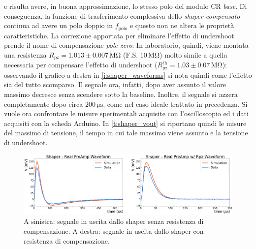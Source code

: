 \documentclass[a4paper,11pt]{article} %
\begin{document}
e risulta avere, in buona approssimazione, lo stesso polo del modulo CR \textit{base}. Di conseguenza, la funzione di
trasferimento complessiva dello \textit{shaper compensato} continua ad avere un polo doppio in $f_{\text{polo}}$ e
questo non ne altera le proprietà caratteristiche. La correzione apportata per eliminare l'effetto di undershoot prende
il nome di compensazione \textit{pole zero}. In laboratorio, quindi, viene montata una resistenza $R_{\text{pz}} = 1.013
\pm 0.007 \, \si{\mega\ohm}$ ($\text{F.S.}\,\, 10 \,\si{\mega\ohm}$) molto simile a quella necessaria per compensare
l'effetto di undershoot ($R_{\text{pz}}^{\text{th}} = 1.03 \pm 0.07 \, \si{\mega\ohm}$): osservando il grafico a destra
in \autoref{i:shaper_waveforms} si nota quindi come l'effetto sia del tutto scomparso. Il segnale ora, infatti, dopo
aver assunto il valore massimo decresce senza scendere sotto la baseline. Inoltre, il segnale si azzera completamente
dopo circa $200\,\si{\us}$, come nel caso ideale trattato in precedenza. Si vuole ora confrontare le misure sperimentali
acquisite con l'oscilloscopio ed i dati acquisiti con la scheda Arduino. In \autoref{t:shaper_vout} si riportano quindi
le misure del massimo di tensione, il tempo in cui tale massimo viene assunto e la tensione di undershoot. 

\begin{figure}[H] 
	\centering
	\includegraphics[width=\linewidth]{../Plots/Shaper/shaper_preamp_waveforms.png} 
	\vspace{-20pt}
	\caption{\small A sinistra: segnale in uscita dallo shaper senza resistenza di compensazione. 
				A destra: segnale in uscita dallo shaper con resistenza di compensazione.} 
	\label{i:shaper_waveforms} 
\end{figure} 
\vspace{-15pt}
\end{document}
